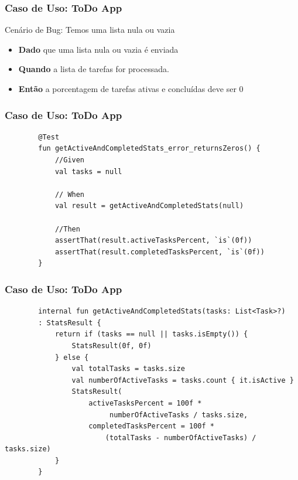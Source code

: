 \documentclass{beamer}
\begin{document}
\begin{frame}
	\frametitle{Caso de Uso: ToDo App}
	Cenário de Bug: Temos uma lista nula ou vazia
	\begin{itemize}
		\item \textbf{Dado} que uma lista nula ou vazia é enviada
		\item \textbf{Quando} a lista de tarefas for processada.
		\item \textbf{Então} a porcentagem de tarefas ativas e concluídas deve ser 0
	\end{itemize}
\end{frame}

\begin{frame}[fragile]
	\frametitle{Caso de Uso: ToDo App}
	\begin{example}
		\begin{lstlisting}
		@Test
		fun getActiveAndCompletedStats_error_returnsZeros() {
			//Given
			val tasks = null
		
			// When
			val result = getActiveAndCompletedStats(null)
		
			//Then
			assertThat(result.activeTasksPercent, `is`(0f))
			assertThat(result.completedTasksPercent, `is`(0f))
		}
		\end{lstlisting}
	\end{example}
\end{frame}

\begin{frame}[fragile]
	\frametitle{Caso de Uso: ToDo App}
	\begin{example}
		\begin{lstlisting}
		internal fun getActiveAndCompletedStats(tasks: List<Task>?)
		: StatsResult {
			return if (tasks == null || tasks.isEmpty()) {
				StatsResult(0f, 0f)
			} else {
				val totalTasks = tasks.size
				val numberOfActiveTasks = tasks.count { it.isActive }
				StatsResult(
					activeTasksPercent = 100f *
						 numberOfActiveTasks / tasks.size,
					completedTasksPercent = 100f * 
						(totalTasks - numberOfActiveTasks) / tasks.size)
			}
		}
		\end{lstlisting}
	\end{example}
\end{frame}
\end{document}
